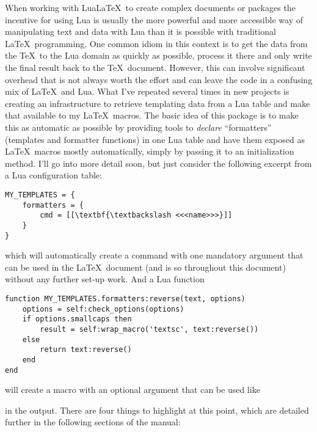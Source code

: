 \documentclass{scrartcl}
\begin{document}
When working with Lua\LaTeX\ to create complex documents or packages the
incentive for using Lua is usually the more powerful and more accessible way of
manipulating text and data with Lua than it is possible with traditional \LaTeX\
programming.  One common idiom in this context is to get the data from the \TeX\
to the Lua domain as quickly as possible, process it there and only write the
final result back to the \TeX\ document.  However, this can involve significant
overhead that is not always worth the effort and can leave the code in a
confusing mix of \LaTeX\ and Lua.  What I've repeated several times in new
projects is creating an infrastructure to retrieve templating data from a Lua
table and make that available to my \LaTeX\ macros.  The basic idea of this
package is to make this as automatic as possible by providing tools to
\emph{declare} “formatters” (templates and formatter functions) in one Lua table
and have them exposed as \LaTeX\ macros mostly automatically, simply by passing
it to an initialization method. I'll go into more detail soon, but just consider
the following excerpt from a Lua configuration table:

\begin{verbatim}
MY_TEMPLATES = {
    formatters = {
        cmd = [[\textbf{\textbackslash <<<name>>>}]]
    }
}
\end{verbatim}

\noindent which will automatically create a command
with one mandatory argument that can be used in the \LaTeX\ document (and is so
throughout this document) without any further set-up work.  And a Lua function

\label{code:function}
\begin{verbatim}
function MY_TEMPLATES.formatters:reverse(text, options)
    options = self:check_options(options)
    if options.smallcaps then
        result = self:wrap_macro('textsc', text:reverse())
    else
        return text:reverse()
    end
end
\end{verbatim}

\noindent will create a macro  with an optional
argument that can be used like

%
in the output.  There are four things
to highlight at this point, which are detailed further in the following sections
of the manual:
\end{document}

